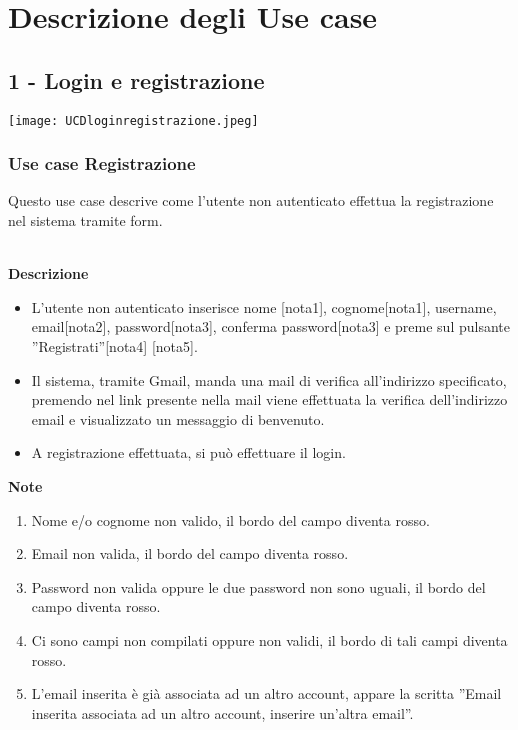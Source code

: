 \documentclass[a4paper,12pt]{article}
\begin{document}
\section*{Descrizione degli Use case }


\subsection*{1 - Login e registrazione}

\begin{center}
  \texttt{[image: UCDloginregistrazione.jpeg]}
\end{center}

\subsubsection*{Use case Registrazione}

Questo use case descrive come l'utente non autenticato effettua la registrazione nel sistema tramite form.



\textbf{\\Descrizione}
\begin{itemize} \setlength\itemsep{0.01em}
\item L'utente non autenticato inserisce nome [nota1], cognome[nota1], username, email[nota2], password[nota3], conferma password[nota3] e preme sul pulsante ''Registrati''[nota4] [nota5].
\item Il sistema, tramite Gmail, manda una mail di verifica all'indirizzo specificato, premendo nel link presente nella mail viene effettuata la verifica dell'indirizzo email e visualizzato un messaggio di benvenuto.
\item A registrazione effettuata, si può effettuare il login.
\end{itemize}

\textbf{Note}
\begin{enumerate} \setlength\itemsep{0.01em}
\item Nome e/o cognome non valido, il bordo del campo diventa rosso.
\item Email non valida, il bordo del campo diventa rosso.
\item Password non valida oppure le due password non sono uguali, il bordo del campo diventa rosso.
\item Ci sono campi non compilati oppure non validi, il bordo di tali campi diventa rosso.
\item L'email inserita è già associata ad un altro account, appare la scritta ''Email inserita associata ad un altro account, inserire un'altra email''.
\end{enumerate}
\end{document}
